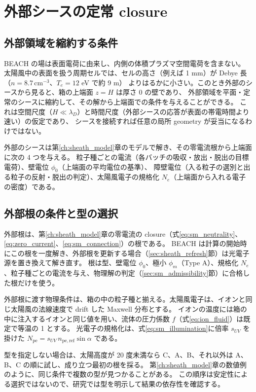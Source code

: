 \chapter{外部シースの定常 closure}
\label{ch:sheath}

\section{外部領域を縮約する条件}
BEACH の場は表面電荷に由来し、内側の体積プラズマ空間電荷を含まない。
太陽風中の表面を扱う周期セルでは、セルの高さ（例えば 1 mm）が Debye 長（$n=8.7\,\mathrm{cm^{-3}}$、$T_e=12$ eV で約 9 m）
よりはるかに小さい。このとき外部のシースから見ると、箱の上端面 $z=H$ は厚さ 0 の壁であり、
外部領域を平面・定常のシースに縮約して、その解から上端面での条件を与えることができる。
これは空間尺度（$H\ll\lambda_D$）と時間尺度（外部シースの応答が表面の帯電時間より速い）の仮定であり、
シースを接続すれば任意の局所 geometry が妥当になるわけではない。

外部のシースは第\ref{ch:sheath_model}章のモデルで解き、その零電流根から上端面に次の 4 つを与える。
粒子種ごとの電流（各バッチの吸収・放出・脱出の目標電荷）、壁電位 $\phi_0$（上端面の平均電位の基準）、
障壁電位（入る粒子の選別と出る粒子の反射・脱出の判定）、太陽風電子の規格化 $N_e$（上端面から入れる電子の密度）である。

\section{外部根の条件と型の選択}
外部根は、第\ref{ch:sheath_model}章の零電流の closure（式\eqref{eq:sm_neutrality}、\eqref{eq:zero_current}、\eqref{eq:sm_connection}）の根である。
BEACH は計算の開始時にこの根を一度解き、外部根を更新する場合（\ref{sec:sheath_refresh}節）は光電子源を置き換えて解き直す。
根は型、壁電位 $\phi_0$、極小 $\phi_m$（Type A）、規格化 $N_e$、粒子種ごとの電流を与え、物理解の判定（\ref{sec:sm_admissibility}節）に合格した根だけを使う。

外部根に渡す物理条件は、箱の中の粒子種と揃える。太陽風電子は、イオンと同じ太陽風の法線速度で drift した Maxwell 分布とする。
イオンの温度には箱の中に注入するイオンと同じ値を用い、流体の圧力係数 $f$（式\eqref{eq:ion_fluid}）は既定で等温の 1 とする。
光電子の規格化は、式\eqref{eq:sm_illumination}に倍率 $s_{UV}$ を掛けた $N_{\mathrm{pe}}=s_{UV}\,n_{\mathrm{pe,ref}}\sin\alpha$ である。

型を指定しない場合は、太陽高度が 20 度未満なら C、A、B、それ以外は A、B、C の順に試し、成り立つ最初の根を採る。
第\ref{ch:sheath_model}章の数値例のように、同じ条件で複数の型が見つかることがある\citep{SanaMishra2023}。
この順序は安定性による選択ではないので、研究では型を明示して結果の依存性を確認する。

